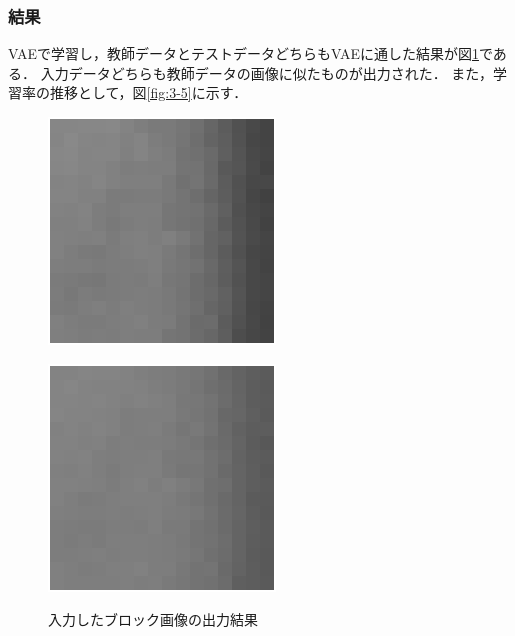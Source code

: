 \documentclass[twocolumn, a4j]{jsarticle}
\begin{document}
\subsubsection{結果}
VAEで学習し，教師データとテストデータどちらもVAEに通した結果が図\ref{fig:3-3-1}である．
入力データどちらも教師データの画像に似たものが出力された．
また，学習率の推移として，図\ref{fig:3-5}に示す．
\begin{figure}[]
  \begin{minipage}[b]{0.49\columnwidth}
    \centering
    \includegraphics[width=0.9\columnwidth]{figure/archive20241219-figure102_1.png}
    \label{fig:3-3}
  \end{minipage}
  \begin{minipage}[b]{0.49\linewidth}
    \centering
    \includegraphics[width=0.9\columnwidth]{figure/archive20241219-figure102_2.png}
    \label{fig:3-4}
  \end{minipage}
  \caption{入力したブロック画像の出力結果}
  \label{fig:3-3-1}
\end{figure}
\end{document}
